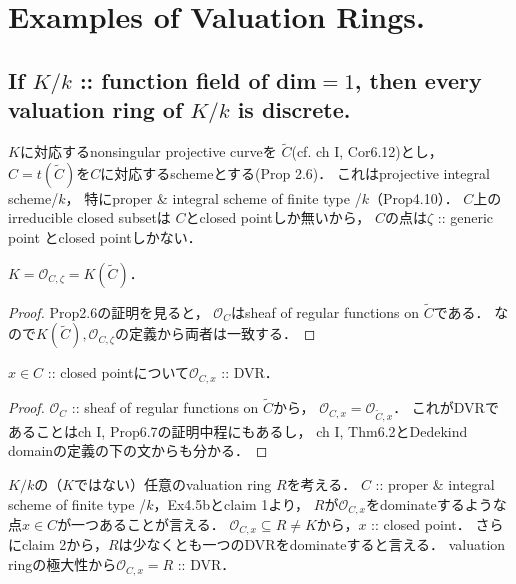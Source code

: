 \documentclass[a4paper]{jsarticle}
\newcommand{\shO}{\mathcal{O}}
\begin{document}
\section{Examples of Valuation Rings.} %
    \subsection{If $K/k$ :: function field of dim$=1$, then every valuation ring of $K/k$ is discrete.}
    $K$に対応するnonsingular projective curveを
    $\tilde{C}$(cf. ch I, Cor6.12)とし，
    $C=t(\tilde{C})$を$C$に対応するschemeとする(Prop 2.6)．
    これはprojective integral scheme/$k$，
    特にproper \& integral scheme of finite type /$k$（Prop4.10）．
    $C$上のirreducible closed subsetは
    $C$とclosed pointしか無いから，
    $C$の点は$\zeta$ :: generic point とclosed pointしかない．

    \begin{Claim}[claim 1]
        $K=\shO_{C,\zeta}=K(\tilde{C})$．
    \end{Claim}
    \begin{proof}
        Prop2.6の証明を見ると，
        $\shO_C$はsheaf of regular functions on $\tilde{C}$である．
        なので$K(\tilde{C}), \shO_{C,\zeta}$の定義から両者は一致する．
    \end{proof}

    \begin{Claim}[claim 2]
        $x \in C$ :: closed pointについて$\shO_{C,x}$ :: DVR．
    \end{Claim}
    \begin{proof}
        $\shO_C$ :: sheaf of regular functions on $\tilde{C}$から，
        $\shO_{C,x}=\shO_{\tilde{C},x}$．
        これがDVRであることはch I, Prop6.7の証明中程にもあるし，
        ch I, Thm6.2とDedekind domainの定義の下の文からも分かる．
    \end{proof}

    $K/k$の（$K$ではない）任意のvaluation ring $R$を考える．
    $C$ :: proper \& integral scheme of finite type /$k$，Ex4.5bとclaim 1より，
    $R$が$\shO_{C,x}$をdominateするような点$x \in C$が一つあることが言える．
    $\shO_{C,x} \subseteq R \neq K$から，$x$ :: closed point．
    さらにclaim 2から，$R$は少なくとも一つのDVRをdominateすると言える．
    valuation ringの極大性から$\shO_{C,x}=R$ :: DVR．
\end{document}
